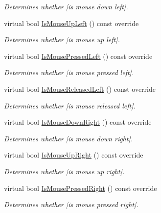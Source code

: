 \begin{DoxyCompactItemize}
\begin{DoxyCompactList}\small\item\em Determines whether \mbox{[}is mouse down left\mbox{]}. \end{DoxyCompactList}\item 
virtual bool \hyperlink{class_g_l_input_handler_ad3604e97a87a9d0616008c2d14582381}{Is\+Mouse\+Up\+Left} () const  override
\begin{DoxyCompactList}\small\item\em Determines whether \mbox{[}is mouse up left\mbox{]}. \end{DoxyCompactList}\item 
virtual bool \hyperlink{class_g_l_input_handler_aef309065f7d2c1e87abc9a9ffa380571}{Is\+Mouse\+Pressed\+Left} () const  override
\begin{DoxyCompactList}\small\item\em Determines whether \mbox{[}is mouse pressed left\mbox{]}. \end{DoxyCompactList}\item 
virtual bool \hyperlink{class_g_l_input_handler_a04778143bbf0c5b98187a490947b7e74}{Is\+Mouse\+Released\+Left} () const  override
\begin{DoxyCompactList}\small\item\em Determines whether \mbox{[}is mouse released left\mbox{]}. \end{DoxyCompactList}\item 
virtual bool \hyperlink{class_g_l_input_handler_aa50de00fc2c0b0cac13b16a817f195d8}{Is\+Mouse\+Down\+Right} () const  override
\begin{DoxyCompactList}\small\item\em Determines whether \mbox{[}is mouse down right\mbox{]}. \end{DoxyCompactList}\item 
virtual bool \hyperlink{class_g_l_input_handler_ac4571a9992fe0d22ded489592ad1afa5}{Is\+Mouse\+Up\+Right} () const  override
\begin{DoxyCompactList}\small\item\em Determines whether \mbox{[}is mouse up right\mbox{]}. \end{DoxyCompactList}\item 
virtual bool \hyperlink{class_g_l_input_handler_aafcf41f222420109c2e10a8cd0ab30e2}{Is\+Mouse\+Pressed\+Right} () const  override
\begin{DoxyCompactList}\small\item\em Determines whether \mbox{[}is mouse pressed right\mbox{]}. \end{DoxyCompactList}\item 

\end{DoxyCompactItemize}
